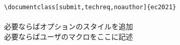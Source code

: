 \documentclass[submit,techreq,noauthor]{ec2021}
\def\Underline{\setbox0\hbox\bgroup\let\\\endUnderline}
\def\endUnderline{\vphantom{y}\egroup\smash{\underline{\box0}}\\}
\def\|{\verb|}
\begin{document}
\noindent
\|\documentclass[submit,techreq,noauthor]{ec2021}|\\
\\
\quad 必要ならばオプションのスタイルを追加\\
\quad 必要ならばユーザのマクロをここに記述\\
\end{document}
